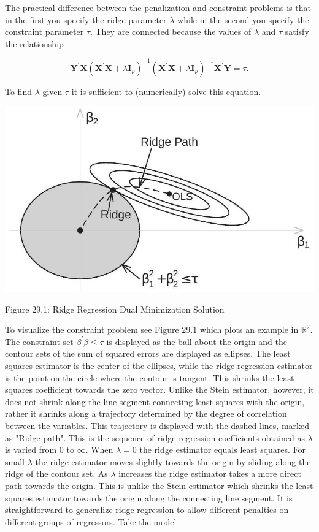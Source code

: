 \documentclass[10pt]{article}
\begin{document}
The practical difference between the penalization and constraint problems is that in the first you specify the ridge parameter $\lambda$ while in the second you specify the constraint parameter $\tau$. They are connected because the values of $\lambda$ and $\tau$ satisfy the relationship

$$
\boldsymbol{Y}^{\prime} \boldsymbol{X}\left(\boldsymbol{X}^{\prime} \boldsymbol{X}+\lambda \boldsymbol{I}_{p}\right)^{-1}\left(\boldsymbol{X}^{\prime} \boldsymbol{X}+\lambda \boldsymbol{I}_{p}\right)^{-1} \boldsymbol{X}^{\prime} \boldsymbol{Y}=\tau .
$$

To find $\lambda$ given $\tau$ it is sufficient to (numerically) solve this equation.

\begin{center}
\includegraphics[max width=\textwidth]{2022_11_27_70699ac9776c9435969dg-05}
\end{center}

Figure 29.1: Ridge Regression Dual Minimization Solution

To visualize the constraint problem see Figure $29.1$ which plots an example in $\mathbb{R}^{2}$. The constraint set $\beta^{\prime} \beta \leq \tau$ is displayed as the ball about the origin and the contour sets of the sum of squared errors are displayed as ellipses. The least squares estimator is the center of the ellipses, while the ridge regression estimator is the point on the circle where the contour is tangent. This shrinks the least squares coefficient towards the zero vector. Unlike the Stein estimator, however, it does not shrink along the line segment connecting least squares with the origin, rather it shrinks along a trajectory determined by the degree of correlation between the variables. This trajectory is displayed with the dashed lines, marked as "Ridge path". This is the sequence of ridge regression coefficients obtained as $\lambda$ is varied from 0 to $\infty$. When $\lambda=0$ the ridge estimator equals least squares. For small $\lambda$ the ridge estimator moves slightly towards the origin by sliding along the ridge of the contour set. As $\lambda$ increases the ridge estimator takes a more direct path towards the origin. This is unlike the Stein estimator which shrinks the least squares estimator towards the origin along the connecting line segment. It is straightforward to generalize ridge regression to allow different penalties on different groups of regressors. Take the model
\end{document}
